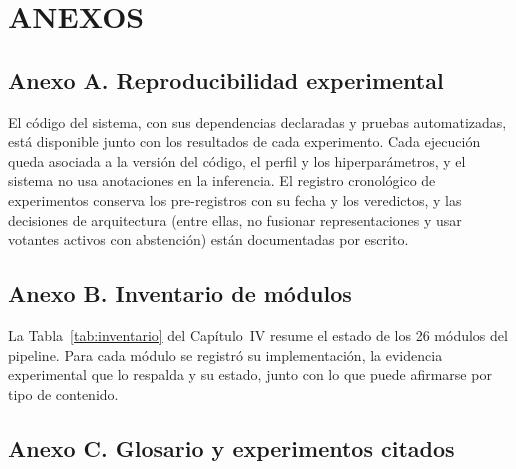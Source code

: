 \chapter*{\center \Large ANEXOS}

\section*{Anexo A. Reproducibilidad experimental}

El código del sistema, con sus dependencias declaradas y pruebas automatizadas, está
disponible junto con los resultados de cada experimento. Cada ejecución queda asociada a la
versión del código, el perfil y los hiperparámetros, y el sistema no usa anotaciones en la
inferencia. El registro cronológico de
experimentos conserva los pre-registros con su fecha y los veredictos, y las decisiones de
arquitectura (entre ellas, no fusionar representaciones y usar votantes activos con
abstención) están documentadas por escrito.

\section*{Anexo B. Inventario de módulos}

La Tabla~\ref{tab:inventario} del Capítulo~IV resume el estado de los 26 módulos del
pipeline. Para cada módulo se registró su implementación, la evidencia experimental que lo
respalda y su estado, junto con lo que puede afirmarse por tipo de contenido.

\section*{Anexo C. Glosario y experimentos citados}

